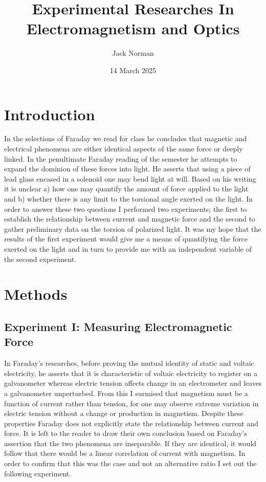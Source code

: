 \documentclass{article}
\title{Experimental Researches In Electromagnetism and Optics}
\author{Jack Norman}
\date{14 March 2025}
\begin{document}
\maketitle

\section{Introduction}
In the selections of Faraday we read for class he concludes that magnetic and electrical phenomena are either identical aspects of the same force or deeply linked. In the penultimate Faraday reading of the semester he attempts to expand the dominion of these forces into light. He asserts that using a piece of lead glass encased in a solenoid one may bend light at will. Based on his writing it is unclear a) how one may quantify the amount of force applied to the light and b) whether there is any limit to the torsional angle exerted on the light. In order to answer these two questions I performed two experiments; the first to establish the relationship between current and magnetic force and the second to gather preliminary data on the torsion of polarized light. It was my hope that the results of the first experiment would give me a means of quantifying the force exerted on the light and in turn to provide me with an independent variable of the second experiment.

\section{Methods}
\subsection{Experiment I: Measuring Electromagnetic Force}
In Faraday's researches, before proving the mutual identity of static and voltaic electricity, he asserts that it is characteristic of voltaic electricity to register on a galvanometer whereas electric tension affects change in an electrometer and leaves a galvanometer unperturbed. From this I surmised that magnetism must be a function of current rather than tension, for one may observe extreme variation in electric tension without a change or production in magnetism. Despite these properties Faraday does not explicitly state the relationship between current and force. It is left to the reader to draw their own conclusion based on Faraday's assertion that the two phenomena are inseparable. If they are identical, it would follow that there would be a linear correlation of current with magnetism. In order to confirm that this was the case and not an alternative ratio I set out the following experiment.
\end{document}
